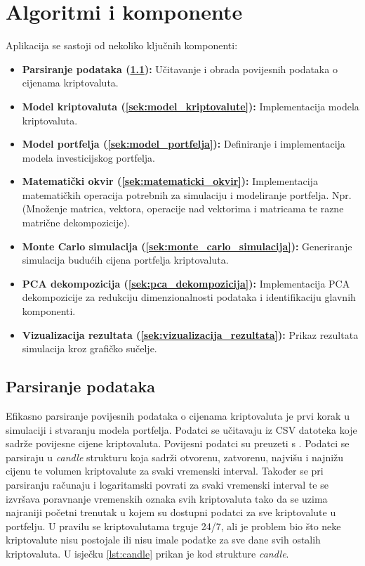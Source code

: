 \documentclass[zavrsnirad, upload]{fer}
\begin{document}
\section{Algoritmi i komponente}
\label{sek:algoritmi_i_komponente}
Aplikacija se sastoji od nekoliko ključnih komponenti:
\begin{itemize}
    \item \textbf{Parsiranje podataka (\ref{sek:parsiranje_podataka}):} Učitavanje i obrada povijesnih
    podataka o cijenama kriptovaluta.

\item \textbf{Model kriptovaluta (\ref{sek:model_kriptovalute}):} Implementacija modela kriptovaluta.

    \item \textbf{Model portfelja (\ref{sek:model_portfelja}):} Definiranje i
        implementacija modela investicijskog portfelja.

    \item \textbf{Matematički okvir (\ref{sek:matematicki_okvir}):} Implementacija matematičkih
    operacija potrebnih za simulaciju i modeliranje portfelja. Npr.
        (Množenje matrica, vektora, operacije nad vektorima i matricama te
        razne matrične dekompozicije).

    \item \textbf{Monte Carlo simulacija (\ref{sek:monte_carlo_simulacija}):} Generiranje simulacija
    budućih cijena portfelja kriptovaluta.

    \item \textbf{PCA dekompozicija (\ref{sek:pca_dekompozicija}):} Implementacija PCA dekompozicije
    za redukciju dimenzionalnosti podataka i identifikaciju glavnih
    komponenti.

    \item \textbf{Vizualizacija rezultata (\ref{sek:vizualizacija_rezultata}):} Prikaz rezultata simulacija
    kroz grafičko sučelje.
\end{itemize}


\subsection{Parsiranje podataka}
\label{sek:parsiranje_podataka}
Efikasno parsiranje povijesnih podataka o cijenama kriptovaluta
je prvi korak u simulaciji i stvaranju modela portfelja.
Podatci se učitavaju iz CSV datoteka koje sadrže povijesne cijene
kriptovaluta. Povijesni podatci su preuzeti s \cite{kaggledataset}.
Podatci se parsiraju u \emph{candle} strukturu koja sadrži
otvorenu, zatvorenu, najvišu i najnižu cijenu te volumen
kriptovalute za svaki vremenski interval. Također se pri parsiranju
računaju i logaritamski povrati za svaki vremenski interval te se izvršava
poravnanje vremenskih oznaka svih kriptovaluta tako da se uzima najraniji
početni trenutak u kojem su dostupni podatci za sve kriptovalute u portfelju.
U pravilu se kriptovalutama trguje
24/7, ali je problem bio što neke kriptovalute nisu postojale ili
nisu imale podatke za sve dane svih ostalih kriptovaluta.
U isječku \ref{lst:candle} prikan je kod strukture \emph{candle}.
\end{document}
